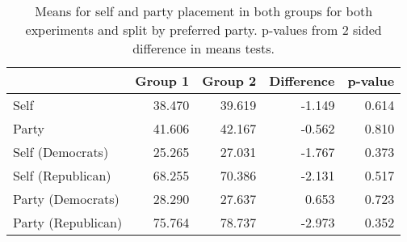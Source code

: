 \begin{table}[ht]
\centering
\begin{tabular}{lrrrr}
  \hline
 & Group 1 & Group 2 & Difference & p-value \\ 
  \hline
  Self & 38.470 & 39.619 & -1.149 & 0.614 \\ 
  Party & 41.606 & 42.167 & -0.562 & 0.810 \\ 
  Self (Democrats) & 25.265 & 27.031 & -1.767 & 0.373 \\ 
  Self (Republican) & 68.255 & 70.386 & -2.131 & 0.517 \\ 
  Party (Democrats) & 28.290 & 27.637 & 0.653 & 0.723 \\ 
  Party (Republican) & 75.764 & 78.737 & -2.973 & 0.352 \\ 
   \hline
\end{tabular}
\caption{Means for self and party placement in both groups for both experiments and split by preferred party. p-values from 2 sided difference in means tests.} 
\label{tab:means}
\end{table}
